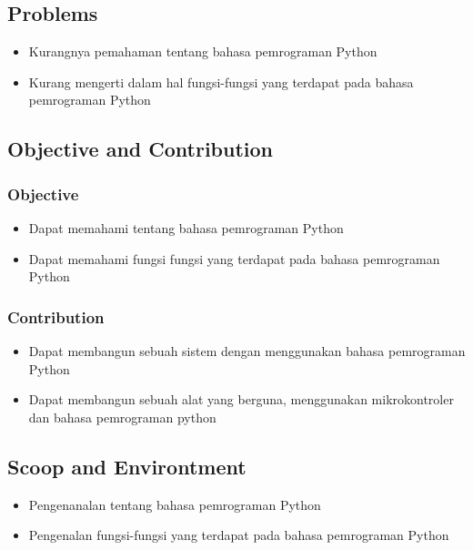 	\subsection{Problems}
		\begin{itemize}
			\item Kurangnya pemahaman tentang bahasa pemrograman Python
			\item Kurang mengerti dalam hal fungsi-fungsi yang terdapat pada bahasa pemrograman Python
		\end{itemize}

	\subsection{Objective and Contribution}
		\subsubsection{Objective}
			\begin{itemize}
				\item Dapat memahami tentang bahasa pemrograman Python
				\item Dapat memahami fungsi fungsi yang terdapat pada bahasa pemrograman Python
			\end{itemize}
	
		\subsubsection{Contribution}
			\begin{itemize}
				\item Dapat membangun sebuah sistem dengan menggunakan bahasa pemrograman Python
				\item Dapat membangun sebuah alat yang berguna, menggunakan mikrokontroler dan bahasa pemrograman python
			\end{itemize}

	\subsection{Scoop and Environtment}
		\begin{itemize}
			\item Pengenanalan tentang bahasa pemrograman Python
			\item Pengenalan fungsi-fungsi yang terdapat pada bahasa pemrograman Python
		\end{itemize}